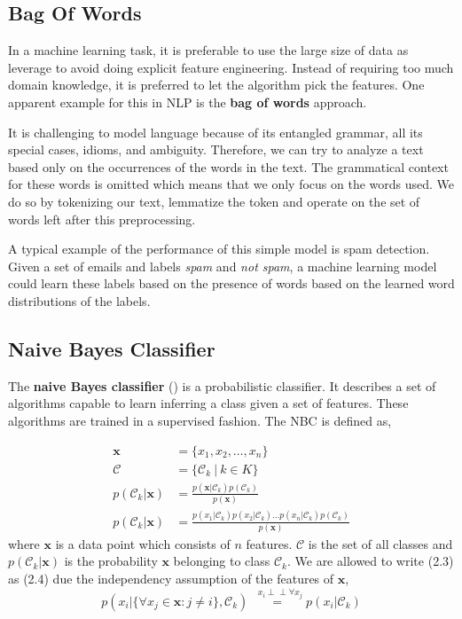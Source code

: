 \subsection{Bag Of Words}\label{section:bow}
In a machine learning task, it is preferable to use the large size of data as leverage to avoid doing explicit feature engineering.
Instead of requiring too much domain knowledge, it is preferred to let the algorithm pick the features.
One apparent example for this in NLP is the \textbf{bag of words} approach.

It is challenging to model language because of its entangled grammar, all its special cases, idioms, and ambiguity.
Therefore, we can try to analyze a text based only on the occurrences of the words in the text.
The grammatical context for these words is omitted which means that we only focus on the words used. We do so by tokenizing our text, lemmatize the token and operate on the set of words left after this preprocessing.

A typical example of the performance of this simple model is spam detection.
Given a set of emails and labels \emph{spam} and \emph{not spam}, a machine learning model could learn these labels based on the presence of words based on the learned word distributions of the labels.

\subsection{Naive Bayes Classifier}\label{section:nbc}
The \textbf{naive Bayes classifier} () is a probabilistic classifier. It describes a set of algorithms capable to learn inferring a class given a set of features. These algorithms are trained in a supervised fashion. The NBC is defined as,

\begin{align}
  \boldsymbol{x} &= \{x_1, x_2, \dots, x_n\} \\
  \mathcal{C} &= \{\mathcal{C}_k \: | \: k \in K \} \\
  p(\mathcal{C}_k|\boldsymbol{x}) &= \frac{p(\boldsymbol{x} |\mathcal{C}_k) p(\mathcal{C}_k)} {p(\boldsymbol{x})} \\
  p(\mathcal{C}_k|\boldsymbol{x}) &= \frac{p(x_1 |\mathcal{C}_k)
                                       p(x_2 |\mathcal{C}_k) \dots
                                       p(x_n |\mathcal{C}_k)
                                       p(\mathcal{C}_k)}{p(\boldsymbol{x})}
\end{align}
where $\boldsymbol{x}$ is a data point which consists of $n$ features. $\mathcal{C}$ is the set of all classes and $p(\mathcal{C}_k|\boldsymbol{x})$ is the probability $\boldsymbol{x}$ belonging to class $\mathcal{C}_k$. We are allowed to write (2.3) as (2.4) due the independency assumption of the features of $\boldsymbol{x}$,
 \[p(x_i| \{\forall x_j \in \boldsymbol{x} : j \neq i \}, \mathcal{C}_k) \overset{\, \,\,\,x_i\perp\!\!\!\perp \forall x_j}{=} p(x_i|\mathcal{C}_k)\]

